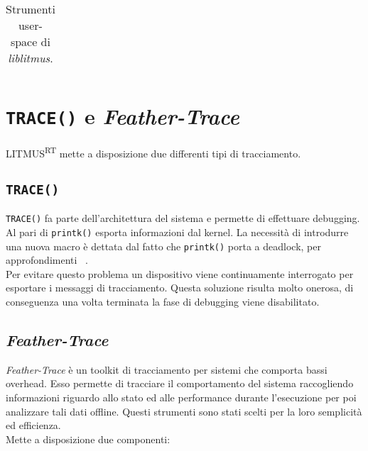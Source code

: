 \begin{appendices}
\begin{table}
\begin{tabular}{|l p{10cm}|}
  	\hline
  	\end{tabular}
  \caption{Strumenti user-space di \textit{liblitmus}.}
  \label{tab:liblitmus_functions}
\end{table}

\section{\texttt{TRACE()} e \textit{Feather-Trace}}
\label{sec:trace}

\noindent LITMUS\textsuperscript{RT} mette a disposizione due differenti tipi di tracciamento.\\

\subsection{\texttt{TRACE()}}

\noindent \texttt{TRACE()} fa parte dell'architettura del sistema e permette di effettuare debugging. Al pari di \texttt{printk()} esporta informazioni dal kernel. La necessità di introdurre una nuova macro è dettata dal fatto che \texttt{printk()} porta a deadlock, per approfondimenti ~\cite{BBBThesis}.\\

\noindent Per evitare questo problema un dispositivo viene continuamente interrogato per esportare i messaggi di tracciamento. Questa soluzione risulta molto onerosa, di conseguenza una volta terminata la fase di debugging viene disabilitato.\\

\subsection{\textit{Feather-Trace}}

\noindent \textit{Feather-Trace} è un toolkit di tracciamento per sistemi che comporta bassi overhead. Esso permette di tracciare il comportamento del sistema raccogliendo informazioni riguardo allo stato ed alle performance durante l'esecuzione per poi analizzare tali dati offline. Questi strumenti sono stati scelti per la loro semplicità ed efficienza.\\

\noindent Mette a disposizione due componenti:\\


\end{appendices}
